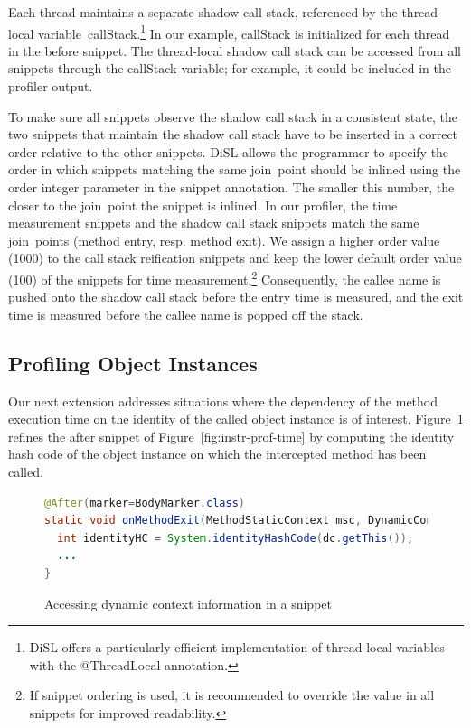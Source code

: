 \documentclass{article}
\newcommand{\brcode}[1]{\textsf{#1}}
\newcommand{\code}[1]{\mbox{\brcode{#1}}}
\begin{document}
Each thread maintains a separate shadow call stack, referenced by the thread-local variable~\code{callStack}.\footnote{DiSL offers a particularly efficient implementation of thread-local variables with the \code{@ThreadLocal} annotation.}
In our example, \code{callStack} is initialized for each thread in the before snippet.
The thread-local shadow call stack can be accessed from all snippets through the \code{callStack} variable; for example, it could be included in the profiler output.

To make sure all snippets observe the shadow call stack in a consistent state, the two snippets that maintain the shadow call stack have to be inserted in a correct order relative to the other snippets.
DiSL allows the programmer to specify the order in which snippets matching the same join~point should be inlined using the \code{order} integer parameter in the snippet annotation.
The smaller this number, the closer to the join~point the snippet is inlined.
In our profiler, the time measurement snippets and the shadow call stack snippets match the same join~points (method entry, resp. method exit).
We assign a higher order value (1000) to the call stack reification snippets and keep the lower default order value (100) of the snippets for time measurement.\footnote{If snippet ordering is used, it is recommended to override the value in all snippets for improved readability.}
Consequently, the callee name is pushed onto the shadow call stack before the entry time is measured, and the exit time is measured before the callee name is popped off the stack.


\subsection{Profiling Object Instances}

Our next extension addresses situations where the dependency of the method execution time on the identity of the called object instance is of interest.
Figure~\ref{fig:instr-prof-identity} refines the after snippet of Figure~\ref{fig:instr-prof-time} by computing the identity hash code of the object instance on which the intercepted method has been called.

\begin{figure}[h!]
\smaller
\begin{lstlisting}[language=Java]
@After(marker=BodyMarker.class)
static void onMethodExit(MethodStaticContext msc, DynamicContext dc) {
  int identityHC = System.identityHashCode(dc.getThis());
  ...
}
\end{lstlisting}
\caption{Accessing dynamic context information in a snippet}
\label{fig:instr-prof-identity}
\end{figure}
\end{document}
